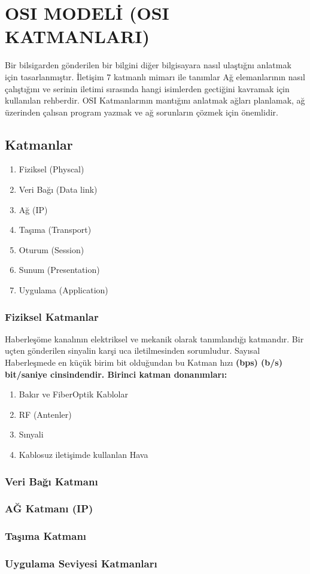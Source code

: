 \section{OSI MODELİ (OSI KATMANLARI)}
Bir bilsigarden gönderilen bir bilgini diğer bilgisayara nasıl ulaştığnı anlatmak için tasarlanmıştır.
İletişim 7 katmanlı mimarı ile tanımlar Ağ elemanlarının nasıl çalıştığını ve serinin iletimi sırasında hangi isimlerden gectiğini kavramak için kullanılan rehberdir.
OSI Katmanlarının mantığını anlatmak ağları planlamak, ağ üzerinden çalısan program yazmak ve ağ sorunların çözmek için önemlidir.
\subsection{Katmanlar}
\begin{enumerate}
	\item Fiziksel (Physcal)
	\item Veri Bağı (Data link)
	\item Ağ (IP)
	\item Taşıma (Transport)
	\item Oturum (Session)
	\item Sunum (Presentation)
	\item Uygulama (Application)
\end{enumerate}

\subsubsection{Fiziksel Katmanlar}
Haberleşöme kanalının elektriksel ve mekanik olarak tanımlandığı katmandır. Bir uçten gönderilen sinyalin karşi uca iletilmesinden sorumludur. Sayısal Haberleşmede en küçük birim bit olduğundan bu Katman hızı \bf{(bps) (b/s) bit/saniye} cinsindendir.
Birinci katman donanımları:
\begin{enumerate}
	\item Bakır ve FiberOptik Kablolar
	\item RF (Antenler)
	\item Sınyali
	\item Kablosuz iletişimde kullanlan Hava
\end{enumerate}

\subsubsection{Veri Bağı Katmanı}


\subsubsection{AĞ Katmanı (IP) }

\subsubsection{Taşıma Katmanı}

\subsubsection{Uygulama Seviyesi Katmanları}


